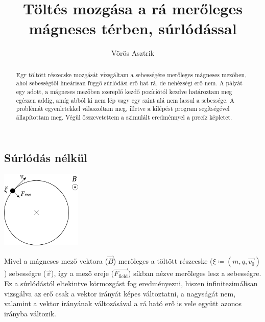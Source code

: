\documentclass[a4paper]{article}
\title{Töltés mozgása a rá merőleges mágneses térben, súrlódással}
\author{Vörös Asztrik}
\date{}
\begin{document}
\maketitle

\begin{abstract}
	Egy töltött részecske mozgását vizsgáltam a sebességére merőleges mágneses mezőben, ahol sebességtől lineárisan függő súrlódási erő hat rá, de nehézségi erő nem. A pályát egy adott, a mágneses mezőben szereplő kezdő pozíciótól kezdve határoztam meg egészen addig, amíg abból ki nem lép vagy egy szint alá nem lassul a sebessége. A problémát egyenletekkel válaszoltam meg, illetve a kilépést program segítségével állapítottam meg. Végül összevetettem a szimulált eredménnyel a precíz képletet.
\end{abstract}

\begin{multicols}{2}

\section{Súrlódás nélkül}
	\begin{center}
		\includegraphics[height=10em]{graphics/base.pdf}
	\end{center}
	Mivel a mágneses mező vektora ($\vec{B}$) merőleges a töltött részecske ($\xi \coloneqq (m,q,\vec{v_0})$) sebességre ($\vec{v}$), így a mező ereje ($\vec{F_{\mathrm{field}}}$) síkban nézve merőleges lesz a sebességre. Ez a súrlódástól eltekintve körmozgást fog eredményezni, hiszen infinitezimálisan vizsgálva az erő csak a vektor irányát képes változtatni, a nagyságát nem, valamint a vektor irányának változásával a rá ható erő is vele együtt azonos irányba változik.


\end{multicols}
\end{document}
